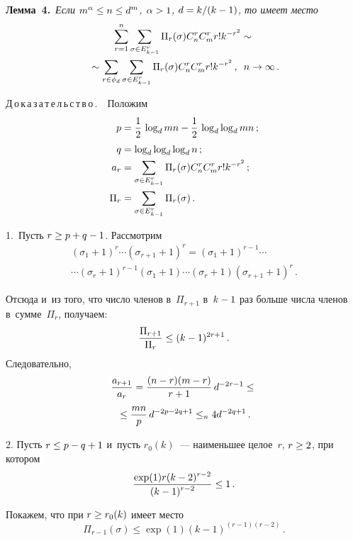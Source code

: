 \begin{multicols}{2}
    \smallskip
    
    \noindent
    \textbf{Лемма~4.}\ \textit{Если $m^\alpha\hm\leq n\hm\leq d^m$, 
$\alpha\hm>1$, $d\hm=k/(k\hm-1)$, то имеет место} 
    \begin{multline*}
    \sum\limits^n_{r=1} \sum\limits_{\sigma\in E^r_{k-1}} \Pi_r(\sigma) C_n^r 
C_m^r r! k^{-r^2} \sim{} \\
{}\sim\sum\limits_{r\in \phi_d} \sum\limits_{\sigma\in E^r_{k-1} }
\Pi_r(\sigma) C_n^r C_m^r r! k^{-r^2}\,,\enskip n\to \infty\,.
\end{multline*}
    
    \noindent
    Д\,о\,к\,а\,з\,а\,т\,е\,л\,ь\,с\,т\,в\,о\,.\ \ Положим
    \begin{align*}
    p&=\displaystyle\frac{\displaystyle 1\mathstrut}{\displaystyle 2\mathstrut}\,\log_d mn -\displaystyle\frac{\displaystyle 1\mathstrut}{\displaystyle 2\mathstrut}\,\log_d \log_d mn\,;\\ 
    q&=\log_d \log_d  \log_d n\,;\\
    a_r &= \sum\limits_{\sigma\in E^r_{k-1}} \Pi_r(\sigma) C_n^r C_m^r r! k^{-
r^2}\,;\\ 
\Pi_r&= \sum\limits_{\sigma\in E^r_{k-1}} \Pi_r(\sigma)\,.
    \end{align*}
    
    1.~Пусть $r\geq p+q\hm-1$. Рассмотрим
    \begin{multline*}
    \left( \sigma_1+1\right)^r\cdots \left( \sigma_{r+1}+1\right)^r=
    \left( \sigma_1+1\right)^{r-1} \cdots\\
    \cdots \left(\sigma_r+1\right)^{r-
1}\left(\sigma_1+1\right) \cdots \left( \sigma_r+1\right) \left( 
\sigma_{r+1}+1\right)^r\,.
\end{multline*}
    
    Отсюда и~из того, что число членов в~$\Pi_{r+1}$ в~$k\hm-1$ раз больше 
числа членов в~сумме~$\Pi_r$, получаем:
    $$
    \displaystyle\frac{\displaystyle \Pi_{r+1}\mathstrut}{\displaystyle \Pi_r\mathstrut}\leq (k-1)^{2r+1}\,.
    $$
    Следовательно,
    \begin{multline*}
    \displaystyle\frac{\displaystyle a_{r+1}\mathstrut}{\displaystyle a_r\mathstrut}=\displaystyle\frac{\displaystyle (n-r)(m-r)\mathstrut}{\displaystyle r+1\mathstrut}\,d^{-2r-1}\leq{}\\
    {}\leq \displaystyle\frac{\displaystyle mn\mathstrut}{\displaystyle p\mathstrut}\,d^{-2p-
2q+1} \leq_n 4d^{-2q+1}\,.
    \end{multline*}
    
    2. Пусть $r\hm\leq p\hm-q\hm+1$ и~пусть $r_0(k)$~--- наименьшее 
целое~$r$, $r\hm\geq 2$, при котором
    $$
    \displaystyle\frac{\displaystyle \exp(1) r(k-2)^{r-2}\mathstrut}{\displaystyle (k-1)^{r-2}\mathstrut}\leq 1\,.
    $$
    
    Покажем, что при $r\hm\geq r_0(k)$ имеет место
    $$
    \Pi_{r-1}(\sigma) \leq \exp(1) (k-1)^{(r-1)(r-2)}\,.
    $$
    

\end{multicols}
